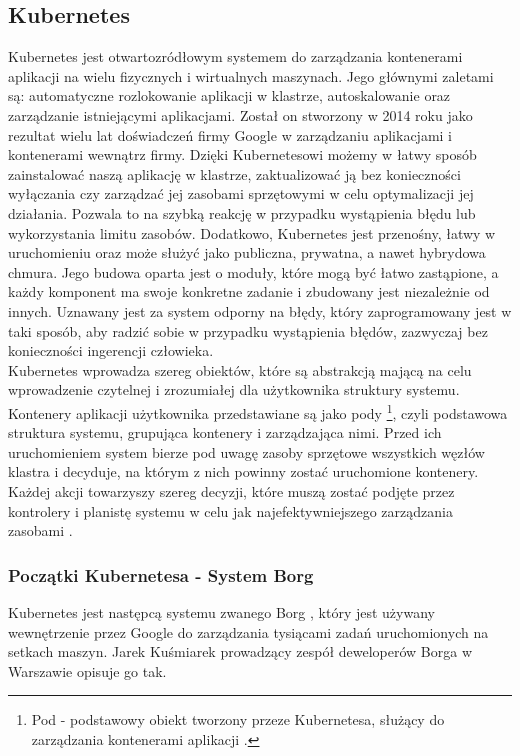 \documentclass[12pt]{report}
\let\Oldsubsection\subsection
\renewcommand{\subsection}{\FloatBarrier\Oldsubsection}
\let\Oldsubsubsection\subsubsection
\renewcommand{\subsubsection}{\FloatBarrier\Oldsubsubsection}
\begin{document}
\subsection{Kubernetes}
Kubernetes jest otwartozródłowym systemem do zarządzania kontenerami aplikacji na wielu fizycznych i wirtualnych maszynach. Jego głównymi zaletami są: automatyczne rozlokowanie aplikacji w klastrze, autoskalowanie oraz zarządzanie istniejącymi aplikacjami. Został on stworzony w 2014 roku jako rezultat wielu lat doświadczeń firmy Google w zarządzaniu aplikacjami i kontenerami wewnątrz firmy. Dzięki Kubernetesowi możemy w łatwy sposób zainstalować naszą aplikację w klastrze, zaktualizować ją bez konieczności wyłączania czy zarządzać jej zasobami sprzętowymi w celu optymalizacji jej działania. Pozwala to na szybką reakcję w przypadku wystąpienia błędu lub wykorzystania limitu zasobów. Dodatkowo, Kubernetes jest przenośny, łatwy w uruchomieniu oraz może służyć jako publiczna, prywatna, a nawet hybrydowa chmura. Jego budowa oparta jest o moduły, które mogą być łatwo zastąpione, a każdy komponent ma swoje konkretne zadanie i zbudowany jest niezależnie od innych. Uznawany jest za system odporny na błędy, który zaprogramowany jest w taki sposób, aby radzić sobie w przypadku wystąpienia błędów, zazwyczaj bez konieczności ingerencji człowieka. \\
	\indent Kubernetes wprowadza szereg obiektów, które są abstrakcją mającą na celu wprowadzenie czytelnej i zrozumiałej dla użytkownika struktury systemu. Kontenery aplikacji użytkownika przedstawiane są jako pody \footnote{Pod - podstawowy obiekt tworzony przeze Kubernetesa, służący do zarządzania kontenerami aplikacji \cite{kubernetes}.}, czyli podstawowa struktura systemu, grupująca kontenery i zarządzająca nimi. Przed ich uruchomieniem system bierze pod uwagę zasoby sprzętowe wszystkich węzłów klastra i decyduje, na którym z nich powinny zostać uruchomione kontenery. Każdej akcji towarzyszy szereg decyzji, które muszą zostać podjęte przez kontrolery i planistę systemu w celu jak najefektywniejszego zarządzania zasobami \cite{kubernetes}.
\subsubsection{Początki Kubernetesa - System Borg}
Kubernetes jest następcą systemu zwanego Borg \cite{borg}, który jest używany wewnętrzenie przez Google do zarządzania tysiącami zadań uruchomionych na setkach maszyn. Jarek Kuśmiarek prowadzący zespół deweloperów Borga w Warszawie opisuje go tak.
\end{document}
